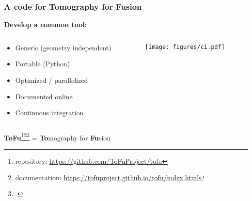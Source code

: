 \documentclass[10pt]{beamer}
\begin{document}
\begin{frame}
\frametitle{A code for Tomography for Fusion}
\textbf{Develop a common tool:}
\begin{columns}
\begin{column}{0.65\textwidth}
	\begin{itemize}
	\item Generic (geometry independent)
	\item Portable (Python)
	\item Optimized / parallelized
	\item Documented online
	\item Continuous integration
	\end{itemize}
\end{column}
\begin{column}{0.35\textwidth}
\vspace{-1cm}
\begin{center}
	\texttt{[image: figures/ci.pdf]}
\end{center}
\end{column}
\end{columns}
\vspace{-0.9cm}

\begin{block}{}
	\begin{center}
	\alert{\textbf{ToFu}\footnote{repository: \url{https://github.com/ToFuProject/tofu}}\footnote{documentation: \url{https://tofuproject.github.io/tofu/index.html} }\footcite{didier2016}} = \alert{\textbf{To}mography for \textbf{Fu}sion}
	\end{center}
\vspace{-5mm}
\end{block}

\end{frame}
\end{document}
